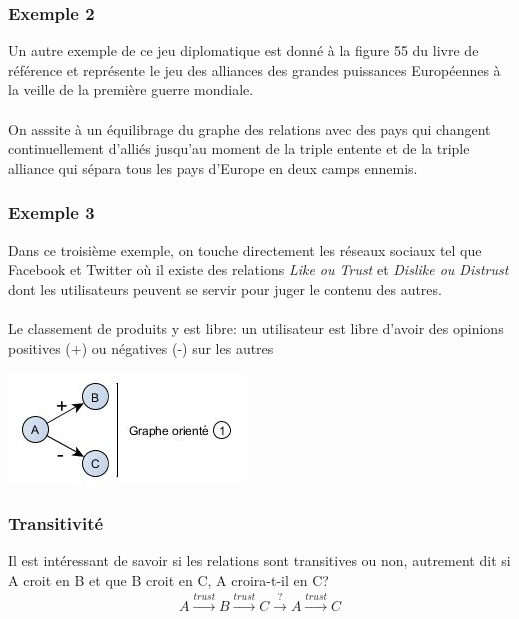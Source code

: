 \subsubsection*{Exemple 2}
Un autre exemple de ce jeu diplomatique est donné à la figure 55 du livre de référence et représente le jeu des alliances des grandes puissances Européennes à la veille de la première guerre mondiale. 
\paragraph{}
 On asssite à un équilibrage du graphe des relations avec des pays qui changent continuellement d'alliés jusqu'au moment de la triple entente et de la triple alliance qui sépara tous les pays d'Europe en deux camps ennemis.

\subsubsection*{Exemple 3}
Dans ce troisième exemple, on touche directement les réseaux sociaux tel que Facebook et Twitter où il existe des relations \textit{Like ou Trust} et \textit{Dislike ou Distrust} dont les utilisateurs peuvent se servir pour juger le contenu des autres.
\paragraph{}
Le classement de produits y est libre: un utilisateur est libre d'avoir des opinions positives (+) ou négatives (-) sur les autres


\includegraphics[scale=1]{images/22_graphe-oriente.png}

\subsubsection*{Transitivité}  

Il est intéressant de savoir si les relations sont transitives ou non, autrement dit si A croit en B et que B croit en C, A croira-t-il en C?
\begin{align*}
A \overset{trust}{\longrightarrow} B \overset{trust}{\longrightarrow} C \overset{?}{\longrightarrow} A \overset{trust}{\longrightarrow} C
\end{align*}

